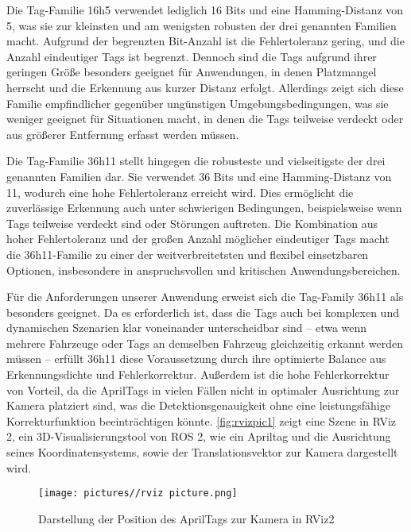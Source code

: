 \documentclass[ngerman]{article}    %
\theoremstyle{definition}
\begin{document}
Die Tag-Familie 16h5 verwendet lediglich 16 Bits und eine Hamming-Distanz von 5, was sie zur kleinsten und am wenigsten robusten der drei genannten Familien macht. Aufgrund der begrenzten Bit-Anzahl ist die Fehlertoleranz gering, und die Anzahl eindeutiger Tags ist begrenzt. Dennoch sind die Tags aufgrund ihrer geringen Größe besonders geeignet für Anwendungen, in denen Platzmangel herrscht und die Erkennung aus kurzer Distanz erfolgt. Allerdings zeigt sich diese Familie empfindlicher gegenüber ungünstigen Umgebungsbedingungen, was sie weniger geeignet für Situationen macht, in denen die Tags teilweise verdeckt oder aus größerer Entfernung erfasst werden müssen.

Die Tag-Familie 36h11 stellt hingegen die robusteste und vielseitigste der drei genannten Familien dar. Sie verwendet 36 Bits und eine Hamming-Distanz von 11, wodurch eine hohe Fehlertoleranz erreicht wird. Dies ermöglicht die zuverlässige Erkennung auch unter schwierigen Bedingungen, beispielsweise wenn Tags teilweise verdeckt sind oder Störungen auftreten. Die Kombination aus hoher Fehlertoleranz und der großen Anzahl möglicher eindeutiger Tags macht die 36h11-Familie zu einer der weitverbreitetsten und flexibel einsetzbaren Optionen, insbesondere in anspruchsvollen und kritischen Anwendungsbereichen.

Für die Anforderungen unserer Anwendung erweist sich die Tag-Family 36h11 als besonders geeignet. Da es erforderlich ist, dass die Tags auch bei komplexen und dynamischen Szenarien klar voneinander unterscheidbar sind – etwa wenn mehrere Fahrzeuge oder Tags an demselben Fahrzeug gleichzeitig erkannt werden müssen – erfüllt 36h11 diese Voraussetzung durch ihre optimierte Balance aus Erkennungsdichte und Fehlerkorrektur. Außerdem ist die hohe Fehlerkorrektur von Vorteil, da die AprilTags in vielen Fällen nicht in optimaler Ausrichtung zur Kamera platziert sind, was die Detektionsgenauigkeit ohne eine leistungsfähige Korrekturfunktion beeinträchtigen könnte. \autoref{fig:rvizpic1} zeigt eine Szene in RViz 2, ein 3D-Visualisierungstool von ROS 2, wie ein Apriltag und die Ausrichtung seines Koordinatensystems, sowie der Translationsvektor zur Kamera dargestellt wird.

\begin{figure}[htb]
    \centering
    \texttt{[image: pictures//rviz picture.png]}
    \caption{Darstellung der Position des AprilTags zur Kamera in RViz2}
    \label{fig:rvizpic1}
\end{figure}
\end{document}
